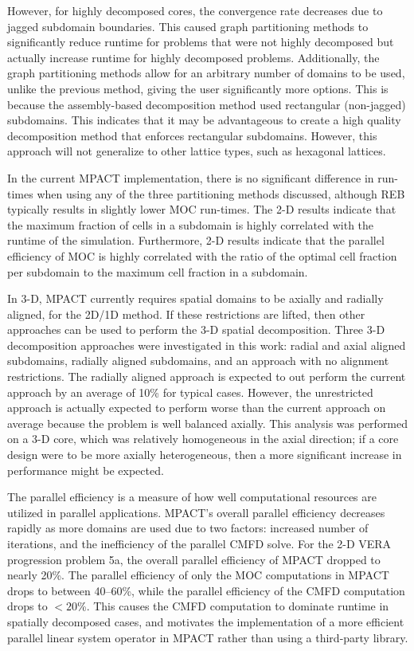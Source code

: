 {{    However, for highly decomposed cores, the convergence rate decreases due to jagged subdomain boundaries.
    This caused graph partitioning methods to significantly reduce runtime for problems that were not highly decomposed but actually increase runtime for highly decomposed problems.
    Additionally, the graph partitioning methods allow for an arbitrary number of domains to be used, unlike the previous method, giving the user significantly more options.
    This is because the assembly-based decomposition method used rectangular (non-jagged) subdomains.
    This indicates that it may be advantageous to create a high quality decomposition method that enforces rectangular subdomains.
    However, this approach will not generalize to other lattice types, such as hexagonal lattices.

    In the current MPACT implementation, there is no significant difference in run-times when using any of the three partitioning methods discussed, although \ac{REB} typically results in slightly lower \ac{MOC} run-times.
    The 2-D results indicate that the maximum fraction of cells in a subdomain is highly correlated with the runtime of the simulation.
    Furthermore, 2-D results indicate that the parallel efficiency of \ac{MOC} is highly correlated with the ratio of the optimal cell fraction per subdomain to the maximum cell fraction in a subdomain.

    In 3-D, MPACT currently requires spatial domains to be axially and radially aligned, for the 2D/1D method.
    If these restrictions are lifted, then other approaches can be used to perform the 3-D spatial decomposition.
    Three 3-D decomposition approaches were investigated in this work: radial and axial aligned subdomains, radially aligned subdomains, and an approach with no alignment restrictions.
    The radially aligned approach is expected to out perform the current approach by an average of 10\% for typical cases.
    However, the unrestricted approach is actually expected to perform worse than the current approach on average because the problem is well balanced axially.
    This analysis was performed on a 3-D core, which was relatively homogeneous in the axial direction; if a core design were to be more axially heterogeneous, then a more significant increase in performance might be expected.

    The parallel efficiency is a measure of how well computational resources are utilized in parallel applications.
    MPACT's overall parallel efficiency decreases rapidly as more domains are used due to two factors: increased number of iterations, and the inefficiency of the parallel \ac{CMFD} solve.
    For the 2-D VERA progression problem 5a, the overall parallel efficiency of MPACT dropped to nearly 20\%.
    The parallel efficiency of only the \ac{MOC} computations in MPACT drops to between 40--60\%, while the parallel efficiency of the \ac{CMFD} computation drops to $<\!\!20$\%.
    This causes the \ac{CMFD} computation to dominate runtime in spatially decomposed cases, and motivates the implementation of a more efficient parallel linear system operator in MPACT rather than using a third-party library.
  }

  \printbibliography
}